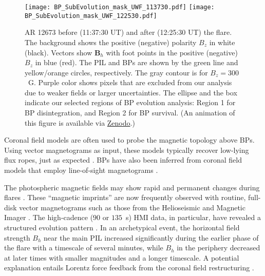 \documentclass[times,twocolumn]{aastex631}
\begin{document}
\begin{CJK*}{UTF8}{gbsn}

\begin{figure*}[t!]
\centering
\texttt{[image: BP\_SubEvolution\_mask\_UWF\_113730.pdf]}
\hspace{8mm}
\texttt{[image: BP\_SubEvolution\_mask\_UWF\_122530.pdf]}
\caption{AR 12673 before (11:37:30 UT) and after (12:25:30 UT) the flare. The background shows the positive (negative) polarity $B_{z}$ in white (black). Vectors show $\bm{B}_h$ with foot points in the positive (negative) $B_z$ in blue (red). The PIL and BPs are shown by the green line and yellow/orange circles, respectively. The gray contour is for $B_{z} = 300$~G. Purple color shows pixels that are excluded from our analysis due to weaker fields or larger uncertainties. The ellipse and the box indicate our selected regions of BP evolution analysis: Region 1 for BP disintegration, and Region 2 for BP survival. (An animation of this figure is available via \href{https://doi.org/10.5281/zenodo.5585623}{Zenodo}.)}
\label{fig:bpevo}
\end{figure*}


Coronal field models are often used to probe the magnetic topology above BPs. Using vector magnetograms as input, these models typically recover low-lying flux ropes, just as expected \citep{canou2009,guoy2010,yelleschaouche2012,chengx2014,liur2014,jiang2017,liulj2019}. BPs have also been inferred from coronal field models that employ line-of-sight magnetograms \citep{delannee1999,fletcher2001,wangtj2002,aulanier2002,mandrini2002}.

The photospheric magnetic fields may show rapid and permanent changes during flares \citep{sudol2005,wanghm2010,petrie2012,castellanosduran2018}. These ``magnetic imprints'' are now frequently observed with routine, full-disk vector magnetograms such as those from the Helioseismic and Magnetic Imager \citep[HMI;][]{schou2012,hoeksema2014}. The high-cadence ($90$ or $135$~s) HMI data, in particular, have revealed a structured evolution pattern \citep{sun2017a}. In an archetypical event, the horizontal field strength $B_h$ near the main PIL increased significantly during the earlier phase of the flare with a timescale of several minutes, while $B_h$ in the periphery decreased at later times with smaller magnitudes and a longer timescale. A potential explanation entails Lorentz force feedback from the coronal field restructuring \citep{hudson2000,fisher2012}.


\end{CJK*}
\end{document}
